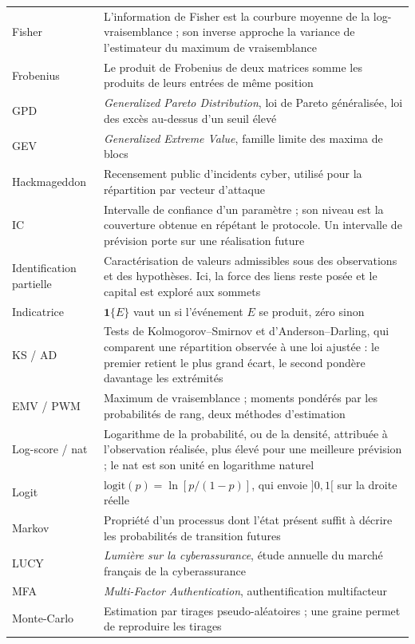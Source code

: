 \begin{center}
\begin{longtable}{@{}>{\raggedright\arraybackslash}p{2.6cm}>{\raggedright\arraybackslash}p{12.2cm}@{}}
Fisher & L'information de Fisher est la courbure moyenne de la log-vraisemblance ; son inverse approche la variance de l'estimateur du maximum de vraisemblance \\
Frobenius & Le produit de Frobenius de deux matrices somme les produits de leurs entrées de même position \\
GPD & \emph{Generalized Pareto Distribution}, loi de Pareto généralisée, loi des excès au-dessus d'un seuil élevé \\
GEV & \emph{Generalized Extreme Value}, famille limite des maxima de blocs \\
Hackmageddon & Recensement public d'incidents cyber, utilisé pour la répartition par vecteur d'attaque \\
IC & Intervalle de confiance d'un paramètre ; son niveau est la couverture obtenue en répétant le protocole. Un intervalle de prévision porte sur une réalisation future \\
Identification partielle & Caractérisation de valeurs admissibles sous des observations et des hypothèses. Ici, la force des liens reste posée et le capital est exploré aux sommets \\
Indicatrice & $\mathbf 1\{E\}$ vaut un si l'événement $E$ se produit, zéro sinon \\
KS / AD & Tests de Kolmogorov--Smirnov et d'Anderson--Darling, qui comparent une répartition observée à une loi ajustée : le premier retient le plus grand écart, le second pondère davantage les extrémités \\
EMV / PWM & Maximum de vraisemblance ; moments pondérés par les probabilités de rang, deux méthodes d'estimation \\
Log-score / nat & Logarithme de la probabilité, ou de la densité, attribuée à l'observation réalisée, plus élevé pour une meilleure prévision ; le nat est son unité en logarithme naturel \\
Logit & $\mathrm{logit}(p)=\ln[p/(1-p)]$, qui envoie $]0,1[$ sur la droite réelle \\
Markov & Propriété d'un processus dont l'état présent suffit à décrire les probabilités de transition futures \\
LUCY & \emph{Lumière sur la cyberassurance}, étude annuelle du marché français de la cyberassurance \\
MFA & \emph{Multi-Factor Authentication}, authentification multifacteur \\
Monte-Carlo & Estimation par tirages pseudo-aléatoires ; une graine permet de reproduire les tirages \\

\end{longtable}
\end{center}
